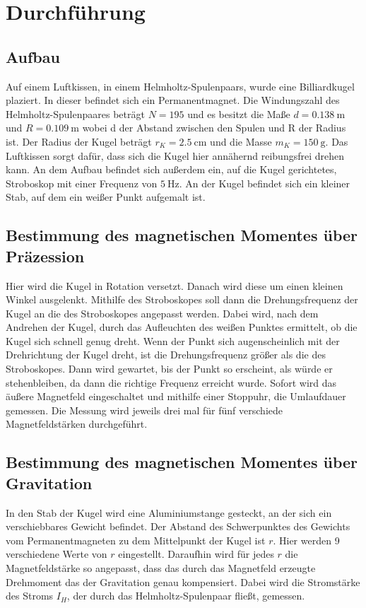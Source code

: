 \section{Durchführung}
\label{sec:Durchführung}
\subsection{Aufbau}
Auf einem Luftkissen, in einem Helmholtz-Spulenpaars, wurde eine Billiardkugel plaziert.
In dieser befindet sich ein Permanentmagnet.
Die Windungszahl des Helmholtz-Spulenpaares beträgt $N=195$ und es besitzt die Maße $d=\qty{0.138}{\meter}$ und $R=\qty{0.109}{\meter}$ wobei d der Abstand zwischen den Spulen und R der Radius ist.
Der Radius der Kugel beträgt $r_K=\qty{2.5}{\centi\meter}$ und die Masse $m_K=\qty{150}{\gram}$.
Das Luftkissen sorgt dafür, dass sich die Kugel hier annähernd reibungsfrei drehen kann.
An dem Aufbau befindet sich außerdem ein, auf die Kugel gerichtetes, Stroboskop mit einer Frequenz von $\qty{5}{\hertz}$.
An der Kugel befindet sich ein kleiner Stab, auf dem ein weißer Punkt aufgemalt ist.



\subsection{Bestimmung des magnetischen Momentes über Präzession}
Hier wird die Kugel in Rotation versetzt.
Danach wird diese um einen kleinen Winkel ausgelenkt.
Mithilfe des Stroboskopes soll dann die Drehungsfrequenz der Kugel an die des Stroboskopes angepasst werden.
Dabei wird, nach dem Andrehen der Kugel, durch das Aufleuchten des weißen Punktes ermittelt, ob die Kugel sich schnell genug dreht.
Wenn der Punkt sich augenscheinlich mit der Drehrichtung der Kugel dreht, ist die Drehungsfrequenz größer als die des Stroboskopes.
Dann wird gewartet, bis der Punkt so erscheint, als würde er stehenbleiben, da dann die richtige Frequenz erreicht wurde.
Sofort wird das äußere Magnetfeld eingeschaltet und mithilfe einer Stoppuhr, die Umlaufdauer gemessen.
Die Messung wird jeweils drei mal für fünf verschiede Magnetfeldstärken durchgeführt. 

\subsection{Bestimmung des magnetischen Momentes über Gravitation}
In den Stab der Kugel wird eine Aluminiumstange gesteckt, an der sich ein verschiebbares Gewicht befindet.
Der Abstand des Schwerpunktes des Gewichts vom Permanentmagneten zu dem Mittelpunkt der Kugel ist $r$.
Hier werden 9 verschiedene Werte von $r$ eingestellt. 
Daraufhin wird für jedes $r$ die Magnetfeldstärke so angepasst, dass das durch das Magnetfeld erzeugte Drehmoment das der Gravitation genau kompensiert.
Dabei wird die Stromstärke des Stroms $I_H$, der durch das Helmholtz-Spulenpaar fließt, gemessen.

